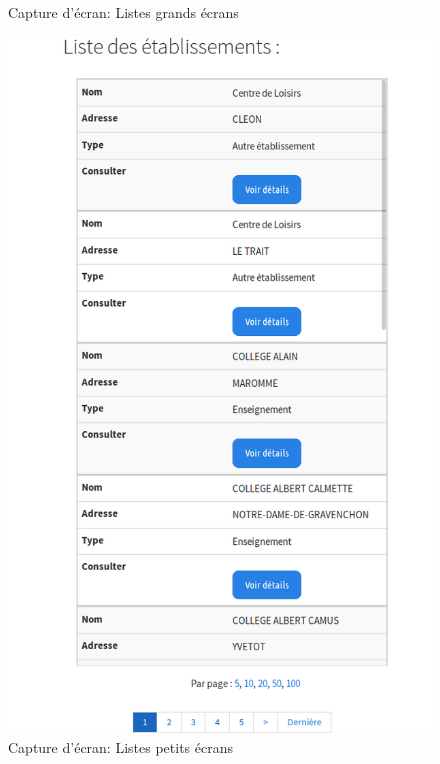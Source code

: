 \begin{frame}
\begin{multicols}{2}
\begin{figure}[!h]
\begin{center}
				\caption{Capture d'écran: Listes grands écrans }
			\end{center}
		\end{figure}
		\begin{figure}[!h]
			\begin{center}
				\includegraphics[scale=0.16]{images/screenshot2.png}
				\caption{Capture d'écran: Listes petits écrans }
			\end{center}
		\end{figure}
	\end{multicols}

\end{frame}

